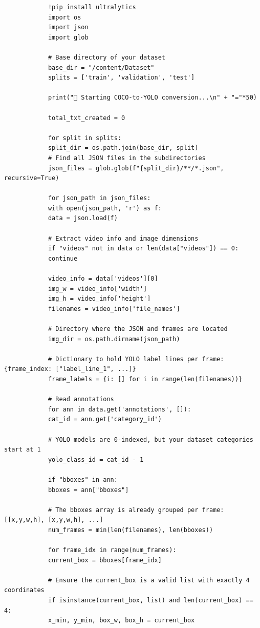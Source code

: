 \documentclass{article}
\begin{document}
\begin{latin}
	\begin{LTR}
		\begin{verbatim}
			!pip install ultralytics
			import os
			import json
			import glob
			
			# Base directory of your dataset
			base_dir = "/content/Dataset"
			splits = ['train', 'validation', 'test']
			
			print("🔄 Starting COCO-to-YOLO conversion...\n" + "="*50)
			
			total_txt_created = 0
			
			for split in splits:
			split_dir = os.path.join(base_dir, split)
			# Find all JSON files in the subdirectories
			json_files = glob.glob(f"{split_dir}/**/*.json", recursive=True)
			
			for json_path in json_files:
			with open(json_path, 'r') as f:
			data = json.load(f)
			
			# Extract video info and image dimensions
			if "videos" not in data or len(data["videos"]) == 0:
			continue
			
			video_info = data['videos'][0]
			img_w = video_info['width']
			img_h = video_info['height']
			filenames = video_info['file_names']
			
			# Directory where the JSON and frames are located
			img_dir = os.path.dirname(json_path)
			
			# Dictionary to hold YOLO label lines per frame: {frame_index: ["label_line_1", ...]}
			frame_labels = {i: [] for i in range(len(filenames))}
			
			# Read annotations
			for ann in data.get('annotations', []):
			cat_id = ann.get('category_id')
			
			# YOLO models are 0-indexed, but your dataset categories start at 1
			yolo_class_id = cat_id - 1
			
			if "bboxes" in ann:
			bboxes = ann["bboxes"]
			
			# The bboxes array is already grouped per frame: [[x,y,w,h], [x,y,w,h], ...]
			num_frames = min(len(filenames), len(bboxes))
			
			for frame_idx in range(num_frames):
			current_box = bboxes[frame_idx]
			
			# Ensure the current_box is a valid list with exactly 4 coordinates
			if isinstance(current_box, list) and len(current_box) == 4:
			x_min, y_min, box_w, box_h = current_box
			

\end{verbatim}
\end{LTR}
\end{latin}
\end{document}

